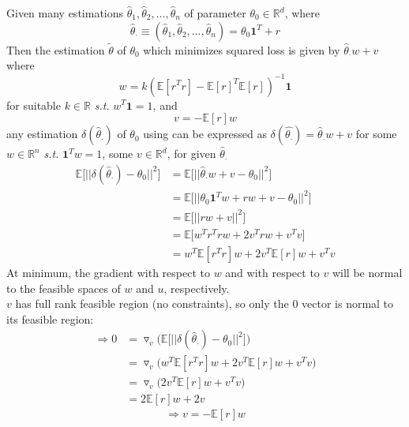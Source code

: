 \documentclass{article}
\begin{document}
\theorem Given many estimations $\hat{\theta}_1,\hat{\theta}_2,...,\hat{\theta}_n$ of parameter $\theta_0 \in \mathbb{R}^d$, where
\[ \hat{\theta}_\cdot \equiv (\hat{\theta}_1,\hat{\theta}_2,...,\hat{\theta}_n) = \theta_0\mathbf{1}^T + r \]
Then the estimation $\tilde{\theta}$ of $\theta_0$ which minimizes squared loss is given by $\hat{\theta}_\cdot w + v$ where
\[ w = k(\mathbb{E}[r^Tr] - \mathbb{E}[r]^T\mathbb{E}[r])^{-1}\mathbf{1} \]
for suitable $k \in \mathbb{R}$ {\it s.t.} $w^T\mathbf{1} = 1$, and \\
\[ v = -\mathbb{E}[r]w \]
\proof any estimation $\delta(\hat{\theta}_\cdot)$ of $\theta_0$ using can be expressed as $\delta(\hat{\theta_\cdot}) = \hat{\theta}_\cdot w + v$ for some $w \in \mathbb{R}^n$ {\it s.t.} $\mathbf{1}^Tw = 1$, some $v \in \mathbb{R}^d$, for given $\hat{\theta}_\cdot$
\begin{align*}
\mathbb{E}\big[||\delta(\hat{\theta}_\cdot) - \theta_0||^2\big] &= \mathbb{E}\big[||\hat{\theta}_\cdot w + v - \theta_0||^2\big]
\\&= \mathbb{E}\big[||\theta_0\mathbf{1}^Tw+rw + v - \theta_0||^2\big]
\\&= \mathbb{E}\big[||rw + v||^2\big]
\\&= \mathbb{E}\big[w^Tr^Trw + 2v^Trw + v^Tv\big]
\\&= w^T\mathbb{E}[r^Tr]w + 2v^T\mathbb{E}[r]w+ v^Tv
\end{align*}
At minimum, the gradient with respect to $w$ and with respect to $v$ will be normal to the feasible spaces of $w$ and $u$, respectively. \\

$v$ has full rank feasible region (no constraints), so only the $0$ vector is normal to its feasible region:
\begin{align*}
\Rightarrow 0 &= \triangledown_v \bigg(\mathbb{E}\big[||\delta(\hat{\theta}_\cdot) - \theta_0||^2\big]\bigg)
\\&= \triangledown_v \Big(w^T\mathbb{E}[r^Tr]w + 2v^T\mathbb{E}[r]w+ v^Tv\Big)
\\&= \triangledown_v \Big(2v^T\mathbb{E}[r]w+ v^Tv\Big)
\\&= 2\mathbb{E}[r]w+ 2v
\end{align*}
\[ \Rightarrow v = -\mathbb{E}[r]w \]
\end{document}
